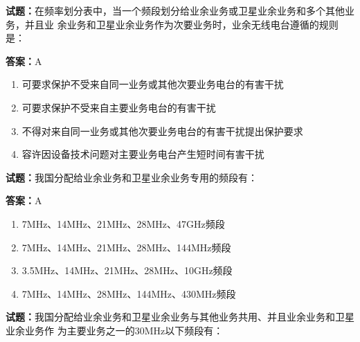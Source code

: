 \documentclass{ctexbook}
\begin{document}
\vspace{1em}

\textbf{试题：}在频率划分表中，当一个频段划分给业余业务或卫星业余业务和多个其他业务，并且业
余业务和卫星业余业务作为次要业务时，业余无线电台遵循的规则是： 

\textbf{答案：}A 

\begin{enumerate}[leftmargin=3em]
  \item 可要求保护不受来自同一业务或其他次要业务电台的有害干扰 

  \item 可要求保护不受来自主要业务电台的有害干扰 

  \item 不得对来自同一业务或其他次要业务电台的有害干扰提出保护要求 

  \item 容许因设备技术问题对主要业务电台产生短时间有害干扰 

\end{enumerate}





\vspace{1em}

\textbf{试题：}我国分配给业余业务和卫星业余业务专用的频段有： 

\textbf{答案：}A 

\begin{enumerate}[leftmargin=3em]
  \item 7MHz、14MHz、21MHz、28MHz、47GHz频段 

  \item 7MHz、14MHz、21MHz、28MHz、144MHz频段 

  \item 3.5MHz、14MHz、21MHz、28MHz、10GHz频段 

  \item 7MHz、14MHz、28MHz、144MHz、430MHz频段 

\end{enumerate}





\vspace{1em}

\textbf{试题：}我国分配给业余业务和卫星业余业务与其他业务共用、并且业余业务和卫星业余业务作
为主要业务之一的30MHz以下频段有： 
\end{document}
